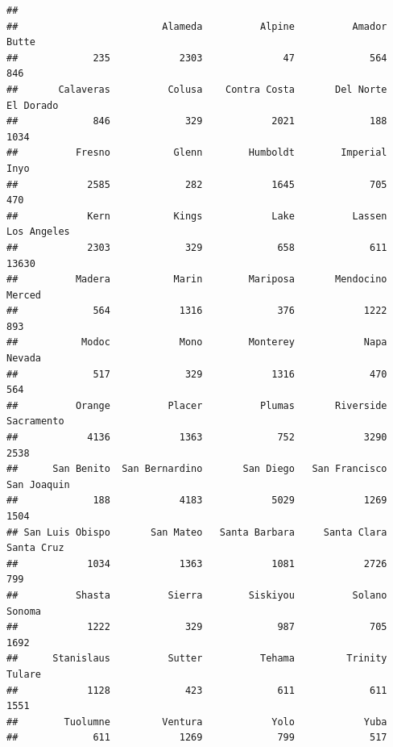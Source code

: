 \documentclass[
]{article}
\newenvironment{Shaded}{\begin{snugshade}}{\end{snugshade}}
\newcommand{\FunctionTok}[1]{\textcolor[rgb]{0.00,0.00,0.00}{#1}}
\newcommand{\NormalTok}[1]{#1}
\newcommand{\OtherTok}[1]{\textcolor[rgb]{0.56,0.35,0.01}{#1}}
\newcommand{\SpecialCharTok}[1]{\textcolor[rgb]{0.00,0.00,0.00}{#1}}
\newcommand{\StringTok}[1]{\textcolor[rgb]{0.31,0.60,0.02}{#1}}
\begin{document}
\begin{Shaded}
\end{Shaded}

\begin{verbatim}
## 
##                         Alameda          Alpine          Amador           Butte 
##             235            2303              47             564             846 
##       Calaveras          Colusa    Contra Costa       Del Norte       El Dorado 
##             846             329            2021             188            1034 
##          Fresno           Glenn        Humboldt        Imperial            Inyo 
##            2585             282            1645             705             470 
##            Kern           Kings            Lake          Lassen     Los Angeles 
##            2303             329             658             611           13630 
##          Madera           Marin        Mariposa       Mendocino          Merced 
##             564            1316             376            1222             893 
##           Modoc            Mono        Monterey            Napa          Nevada 
##             517             329            1316             470             564 
##          Orange          Placer          Plumas       Riverside      Sacramento 
##            4136            1363             752            3290            2538 
##      San Benito  San Bernardino       San Diego   San Francisco     San Joaquin 
##             188            4183            5029            1269            1504 
## San Luis Obispo       San Mateo   Santa Barbara     Santa Clara      Santa Cruz 
##            1034            1363            1081            2726             799 
##          Shasta          Sierra        Siskiyou          Solano          Sonoma 
##            1222             329             987             705            1692 
##      Stanislaus          Sutter          Tehama         Trinity          Tulare 
##            1128             423             611             611            1551 
##        Tuolumne         Ventura            Yolo            Yuba 
##             611            1269             799             517
\end{verbatim}

\begin{Shaded}
\end{Shaded}
\end{document}
